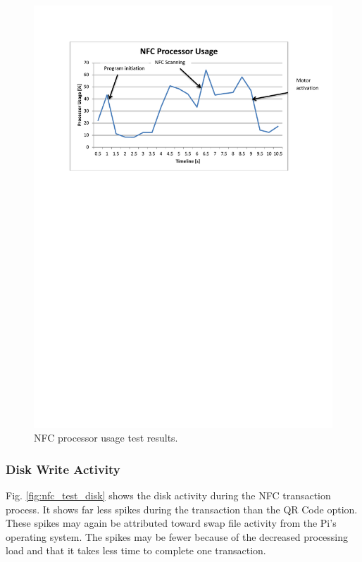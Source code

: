 \begin{figure}
 \centering 
 \includegraphics[clip=true, trim = 0 500 0 70,
 scale=0.7]{nfc_test_cpu}
 \caption{NFC processor usage test results.}
 \label{fig:nfc_test_cpu}
\end{figure}

\subsubsection{Disk Write Activity}

Fig. \ref{fig:nfc_test_disk} shows the disk activity during the NFC transaction process.
It shows far less spikes during the transaction than the QR Code option.  These spikes may
again be attributed toward swap file activity from the Pi's operating system.
The spikes may be fewer because of the decreased processing load and that it
takes less time to complete one transaction.

